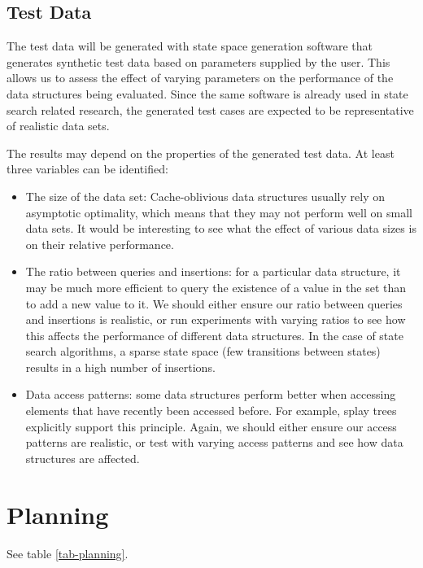 \documentclass{acm_proc_article-sp}
\begin{document}
\subsection{Test Data}
The test data will be generated with state space generation software that generates synthetic test data based on parameters supplied by the user. This allows us to assess the effect of varying parameters on the performance of the data structures being evaluated. Since the same software is already used in state search related research, the generated test cases are expected to be representative of realistic data sets.

The results may depend on the properties of the generated test data. At least three variables can be identified:
\begin{itemize}
\item The size of the data set: Cache-oblivious data structures usually rely on asymptotic optimality, which means that they may not perform well on small data sets. It would be interesting to see what the effect of various data sizes is on their relative performance.
\item The ratio between queries and insertions: for a particular data structure, it may be much more efficient to query the existence of a value in the set than to add a new value to it. We should either ensure our ratio between queries and insertions is realistic, or run experiments with varying ratios to see how this affects the performance of different data structures. In the case of state search algorithms, a sparse state space (few transitions between states) results in a high number of insertions.
\item Data access patterns: some data structures perform better when accessing elements that have recently been accessed before. For example, splay trees explicitly support this principle. Again, we should either ensure our access patterns are realistic, or test with varying access patterns and see how data structures are affected.
\end{itemize}

\section{Planning}
See table \ref{tab-planning}.
\end{document}
